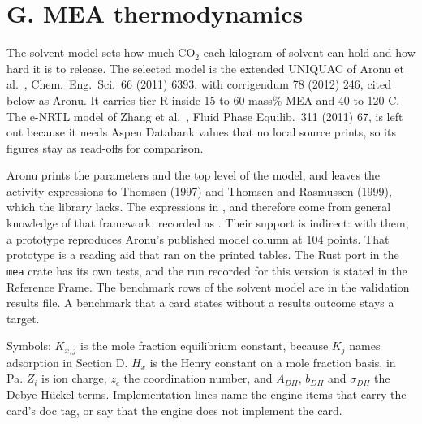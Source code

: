 \section{G. MEA thermodynamics}\label{sec:G}
The solvent model sets how much CO$_2$ each kilogram of solvent can hold and how hard it is to release. The selected model is the extended UNIQUAC of Aronu et al.\ \cite{Aronu}, Chem.\ Eng.\ Sci.\ 66 (2011) 6393, with corrigendum 78 (2012) 246, cited below as Aronu. It carries tier R inside 15 to 60 mass\% MEA and 40 to 120 C. The e-NRTL model of Zhang et al.\ \cite{Zhang11}, Fluid Phase Equilib.\ 311 (2011) 67, is left out because it needs Aspen Databank values that no local source prints, so its figures stay as read-offs for comparison.

Aronu prints the parameters and the top level of the model, and leaves the activity expressions to Thomsen (1997) and Thomsen and Rasmussen (1999), which the library lacks. The expressions in ,  and  therefore come from general knowledge of that framework, recorded as . Their support is indirect: with them, a prototype reproduces Aronu's published model column at 104 points. That prototype is a reading aid that ran on the printed tables. The Rust port in the \texttt{mea} crate has its own tests, and the run recorded for this version is stated in the Reference Frame. The benchmark rows of the solvent model are in the validation results file. A benchmark that a card states without a results outcome stays a target.

Symbols: $K_{x,j}$ is the mole fraction equilibrium constant, because $K_j$ names adsorption in Section D. $H_x$ is the Henry constant on a mole fraction basis, in Pa. $Z_i$ is ion charge, $z_c$ the coordination number, and $A_{DH}$, $b_{DH}$ and $\sigma_{DH}$ the Debye-H\"uckel terms. Implementation lines name the engine items that carry the card's doc tag, or say that the engine does not implement the card.


